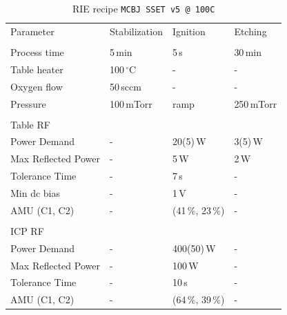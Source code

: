         \begin{table}
            \centering
            \caption{RIE recipe \texttt{MCBJ SSET v5 @ 100C}}
            \label{tab:methods:rie_parameter}
            \vspace{1em}
            \begin{tabular}{llll}
                \hline
                Parameter       & Stabilization         & Ignition      & Etching  \\
                \\\hline
                Process time    & 5\,min                & 5\,s          & 30\,min       \\
                Table heater    & 100\,$^\circ$C   & -             & -             \\
                Oxygen flow     & 50\,sccm           & -             & -             \\
    
                Pressure        & 100\,mTorr & ramp & 250\,mTorr \\       
    
                \\\hline
                Table RF &&&\\
                Power Demand            & - & 20(5)\,W              & 3(5)\,W \\
                Max Reflected Power     & - & 5\,W                  & 2\,W \\
                Tolerance Time          & - & 7\,s                  & - \\
                Min dc bias             & - & 1\,V                  & - \\
                AMU (C1, C2)            & - & (41\,\%, 23\,\%)      & - \\
    
                \\\hline
                ICP RF &&&\\
                Power Demand            & - & 400(50)\,W            & - \\
                Max Reflected Power     & - & 100\,W                & - \\
                Tolerance Time          & - & 10\,s                 & - \\
                AMU (C1, C2)            & - & (64\,\%, 39\,\%)      & - \\
                
            \end{tabular}
        \end{table}
        
